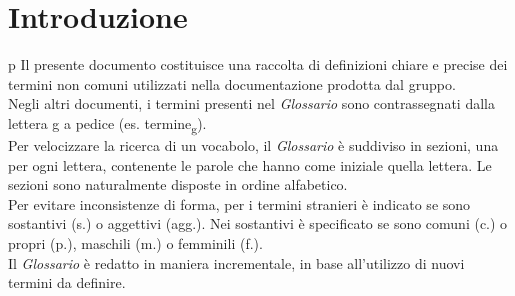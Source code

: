 \section*{Introduzione}
p
    Il presente documento costituisce una raccolta di definizioni chiare e precise dei termini non
    comuni utilizzati nella documentazione prodotta dal gruppo. \\
    Negli altri documenti, i termini presenti nel \textit{Glossario} sono contrassegnati dalla lettera g a pedice (es. termine\textsubscript{g}).\\
    Per velocizzare la ricerca di un vocabolo, il \textit{Glossario} è suddiviso in sezioni,
    una per ogni lettera, contenente le parole che hanno come iniziale quella lettera. Le sezioni sono 
    naturalmente disposte in ordine alfabetico.\\
    Per evitare inconsistenze di forma, per i termini stranieri è indicato se sono sostantivi (s.) o aggettivi (agg.).
    Nei sostantivi è specificato se sono comuni (c.) o propri (p.), maschili (m.) o femminili (f.).\\
    Il \textit{Glossario} è redatto in maniera incrementale, in base all'utilizzo
    di nuovi termini da definire.
